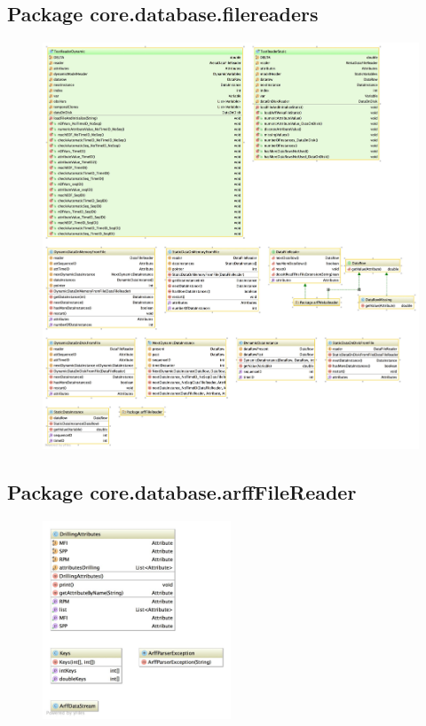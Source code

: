 \subsection{Package core.database.filereaders}
\begin{figure}[H]
  \centering
    \includegraphics[width=\textwidth]{ClassDiagrams/core_database_filereaders.jpg}
\end{figure}

\subsection{Package core.database.arffFileReader}
\begin{figure}[H]
  \centering
    \includegraphics[width=0.5\textwidth]{ClassDiagrams/core_database_filereaders_arfffilereader.jpg}
\end{figure}



